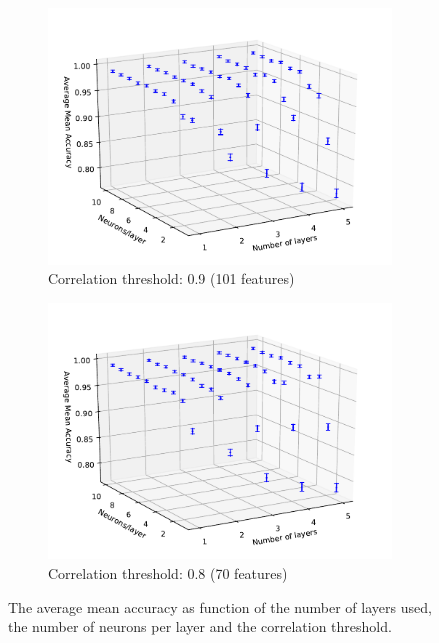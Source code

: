 \documentclass[paper=a4, fontsize=11pt]{scrartcl} %
\begin{document}
\begin{figure}[H]
\begin{subfigure}{0.5\linewidth}
		\includegraphics[width=0.9\linewidth]{../output/neural_network/figures/nn_architecture_global_standard_941_486_feature_pearson_90}
		\caption{Correlation threshold: 0.9 (101 features)}
	\end{subfigure}
	\begin{subfigure}{0.5\linewidth}
		\centering
		\includegraphics[width=0.9\linewidth]{../output/neural_network/figures/nn_architecture_global_standard_941_486_feature_pearson_80}
		\caption{Correlation threshold: 0.8 (70 features)}
	\end{subfigure}
	\caption{The average mean accuracy as function of the number of layers used, the number of neurons per layer and the correlation threshold.}
	\label{fig:nn_architecture_global_gauss}
\end{figure} 
\end{document}
